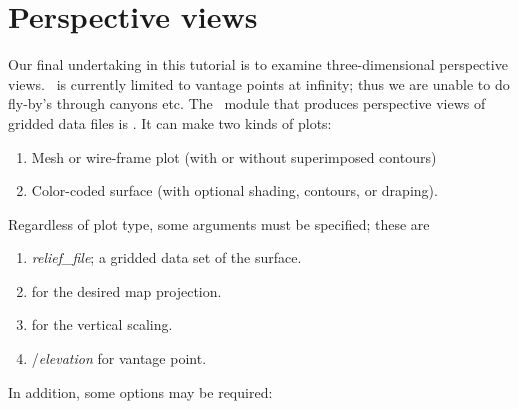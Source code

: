 \documentclass{report}
\begin{document}
\section{Perspective views}

Our final undertaking in this tutorial is to examine three-dimensional
perspective views.  \GMT\ is currently limited to vantage points at
infinity; thus we are unable to do fly-by's through canyons etc.  The
\GMT\ module that produces perspective views of gridded data files is
.  It can make two kinds of plots:

\begin{enumerate}

\item Mesh or wire-frame plot (with or without superimposed contours)

\item Color-coded surface (with optional shading, contours, or draping).

\end{enumerate}

Regardless of plot type, some arguments must be specified; these are

\begin{enumerate}

\item {\it relief\_file}; a gridded data set of the surface.

\item {} for the desired map projection.

\item {} for the vertical scaling.

\item {}/{\it elevation} for vantage point.

\end{enumerate}


In addition, some options may be required:
\end{document}
